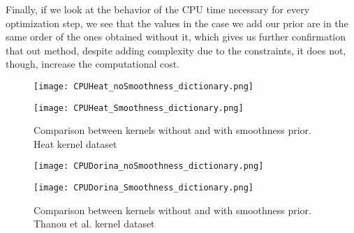Finally, if we look at the behavior of the CPU time necessary for every optimization step, we see that the values in the case we add our prior are in the same order of the ones obtained without it, which gives us further confirmation that out method, despite adding complexity due to the constraints, it does not, though, increase the computational cost.

\begin{figure}
  \begin{minipage}[c]{.5\textwidth}
    \centering
    \texttt{[image: CPUHeat\_noSmoothness\_dictionary.png]}
  \end{minipage}
  \begin{minipage}[c]{.5\textwidth}
    \centering
    \texttt{[image: CPUHeat\_Smoothness\_dictionary.png]}
  \end{minipage}
  \caption{Comparison between kernels without and with smoothness prior. Heat kernel dataset}
  \label{fig:CPUHeatDictionary}
\end{figure}

\begin{figure}
  \begin{minipage}[c]{.5\textwidth}
    \centering
    \texttt{[image: CPUDorina\_noSmoothness\_dictionary.png]}
  \end{minipage}
    \begin{minipage}[c]{.5\textwidth}
    \centering
  \texttt{[image: CPUDorina\_Smoothness\_dictionary.png]}
  \end{minipage}
  \caption{Comparison between kernels without and with smoothness prior. Thanou et al. kernel dataset}
  \label{fig:CPUDorinaDictionary}
\end{figure}

